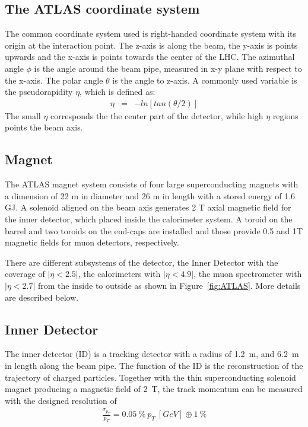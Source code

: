 \subsection{The ATLAS coordinate system}
The common coordinate system used is right-handed coordinate system with its origin at the interaction point. The z-axis is along the beam, the y-axis is points upwards and the x-axis is points towards the center of the LHC. The azimuthal angle $\phi$ is the angle around the beam pipe, measured in x-y plane with respect to the x-axis. The polar angle $\theta$ is the angle to z-axis. A commonly used variable is the pseudorapidity $\eta$, which is defined as:
\begin{eqnarray*}
\eta &=& -ln[tan(\theta/2)]
\end{eqnarray*}
The small $\eta$ corresponds the the center part of the detector, while high $\eta$ regions points the beam axis. \\

\subsection{Magnet}
The ATLAS magnet system consists of four large superconducting magnets with a dimension of 22 m in diameter and 26 m in length with a stored energy of 1.6 GJ. A solenoid aligned on the beam axis generates 2 T axial magnetic field for the inner detector, which placed inside the calorimeter system. A toroid on the barrel and two toroids on the end-caps are installed and those provide 0.5 and 1T magnetic fields for muon detectors, respectively.

There are different subsystems of the detector, the Inner Detector with the coverage of $|\eta < 2.5|$, the calorimeters with $|\eta < 4.9|$, the muon spectrometer with $|\eta < 2.7|$ from the inside to outside as shown in Figure~\ref{fig:ATLAS}. More details are described below.

\subsection{Inner Detector}
The inner detector (ID) is a tracking detector with a radius of 1.2~m, and 6.2~m in length along the beam pipe. The function of the ID is the reconstruction of the trajectory of charged particles. 
Together with the thin superconducting solenoid magnet producing a magnetic field of 2~T, the track momentum can be measured with the designed resolution of 
\begin{eqnarray*}
    \frac{\sigma_{p_{T}}}{p_{T}} = 0.05~\% ~p_{T} ~[GeV] \oplus 1~\%
\end{eqnarray*}

